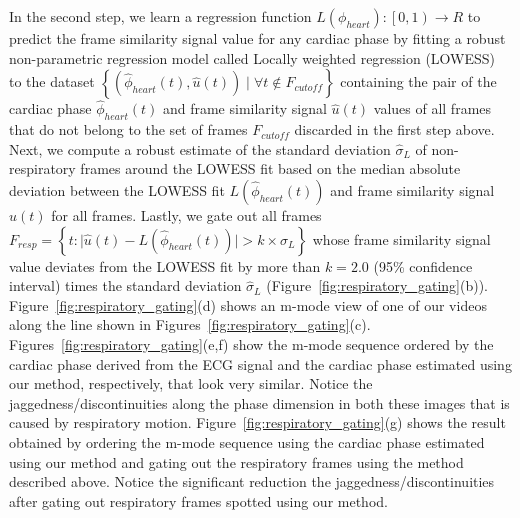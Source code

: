 \documentclass[journal]{IEEEtran}
\begin{document}
	In the second step, we learn a regression function $L(\phi_{heart}) : \left [  0, 1\right ) \to R$ to predict the frame similarity signal value for any cardiac phase by fitting a robust non-parametric regression model called Locally weighted regression (LOWESS)~\cite{Cleveland1988} to the dataset $\left \{ \left(\hat{\phi}_{heart}(t), \hat{u}(t) \right) \mid \forall t \notin F_{cutoff}  \right \}$ containing the pair of the cardiac phase $\hat{\phi}_{heart}(t)$ and frame similarity signal $\hat{u}(t)$  values of all frames that do not belong to the set of frames $F_{cutoff}$ discarded in the first step above. Next, we compute a robust estimate of the standard deviation $\hat{\sigma}_{L}$ of non-respiratory frames around the LOWESS fit based on the median absolute deviation between the LOWESS fit $L( \hat{\phi}_{heart}(t) )$ and frame similarity signal $\hat{u}(t)$ for all frames. Lastly, we gate out all frames $F_{resp} = \left \{ t : \lvert \hat{u}(t) - L( \hat{\phi}_{heart}(t) ) \rvert   > k \times \hat{\sigma}_{L}  \right \}$
whose frame similarity signal value deviates from the LOWESS fit by more than $k = 2.0$ (95\% confidence interval) times the standard deviation $\hat{\sigma}_{L}$ (Figure~\ref{fig:respiratory_gating}(b)). 
Figure~\ref{fig:respiratory_gating}(d) shows an m-mode view of one of our videos along the line shown in Figures~\ref{fig:respiratory_gating}(c). Figures~\ref{fig:respiratory_gating}(e,f) show the m-mode sequence ordered by the cardiac phase derived from the ECG signal and the cardiac phase estimated using our method, respectively, that look very similar. Notice the jaggedness/discontinuities along the phase dimension in both these images that is caused by respiratory motion. Figure~\ref{fig:respiratory_gating}(g) shows the result obtained by ordering the m-mode sequence using the cardiac phase estimated using our method and gating out the respiratory frames using the method described above. Notice the significant reduction the jaggedness/discontinuities after gating out respiratory frames spotted using our method.
%
\end{document}
